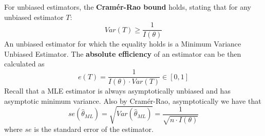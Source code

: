 For unbiased estimators, the \textbf{Cramér-Rao bound} holds, stating that for any unbiased estimator $T$:
\begin{equation*}
    Var(T) \geq \frac{1}{I(\theta)}
\end{equation*}   
An unbiased estimator for which the equality holds is a Minimum Variance Unbiased Estimator. The \textbf{absolute efficiency} of an estimator can be then calculated as
\begin{equation*}
    e(T) = \frac{1}{I(\theta) \cdot Var(T)} \in [0,1]
\end{equation*}   
Recall that a MLE estimator is always asymptotically unbiased and has asymptotic minimum variance. Also by Cramér-Rao, asymptotically we have that
\begin{equation*}
    se(\hat{\theta}_{ML}) = \sqrt{Var(\hat{\theta}_{ML})} = \frac{1}{\sqrt{n \cdot I(\theta)}}
\end{equation*}   
where $se$ is the standard error of the estimator.